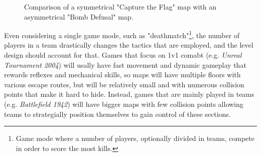 \documentclass{Configuration_Files/PoliMi3i_thesis}
\begin{document}
\begin{figure}[H]
    \centering
    \quad
    \caption[Map comparison]{Comparison of a symmetrical "Capture the Flag" map with an asymmetrical "Bomb Defusal" map.}
    \label{fig:maps_compare}
\end{figure}

Even considering a single game mode, such as "deathmatch"\footnote{Game mode where a number of players, optionally divided in teams, compete in order to score the most kills.}, the number of players in a team drastically changes the tactics that are employed, and the level design should account for that. Games that focus on 1v1 comabt (e.g. \textit{Unreal Tournament 2004}) will usally have fast movement and dynamic gameplay that rewards reflexes and mechanical skills, so maps will have multiple floors with various escape routes, but will be relatively small and with numerous collision points that make it hard to hide. Instead, games that are mainly played in teams (e.g. \textit{Battlefield 1942}) will have bigger maps with few collision points allowing teams to strategially position themselves to gain control of these sections.
\end{document}
